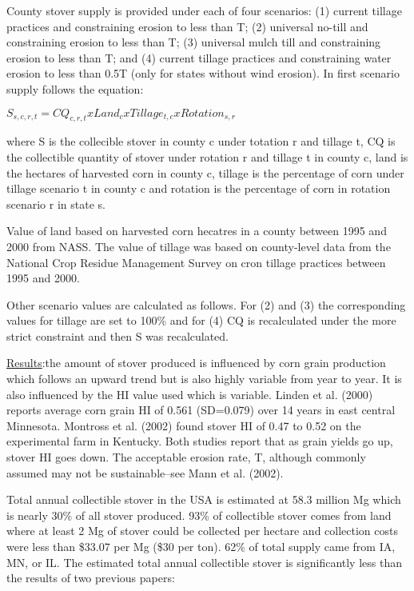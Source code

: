 \documentclass{article}\usepackage[]{graphicx}\usepackage[]{color}
\begin{document}
County stover supply is provided under each of four scenarios: (1) current tillage practices and constraining erosion to less than T; (2) universal no-till and constraining erosion to less than T; (3) universal mulch till and constraining erosion to less than T; and (4) current tillage practices and constraining water erosion to less than 0.5T (only for states without wind erosion).  In first scenario supply follows the equation: \\

\begin{centering}
$S_{s,c,r,t}=CQ_{c,r,t} x Land_c x Tillage_{t,c} x Rotation_{s,r}$
\end{centering}

where S is the collecible stover in county c under totation r and tillage t, CQ is the collectible quantity of stover under rotation r and tillage t in county c, land is the hectares of harvested corn in county c, tillage is the percentage of corn under tillage scenario t in county c and rotation is the percentage of corn in rotation scenario r in state s.

Value of land based on harvested corn hecatres in a county between 1995 and 2000 from NASS.  The value of tillage was based on county-level data from the National Crop Residue Management Survey on cron tillage practices between 1995 and 2000.  

Other scenario values are calculated as follows.  For (2) and (3) the corresponding values for tillage are set to 100\% and for (4) CQ is recalculated under the more strict constraint and then S was recalculated.

\underline{Results}:the amount of stover produced is influenced by corn grain production which follows an upward trend but is also highly variable from year to year.  It is also influenced by the HI value used which is variable.  Linden et al. (2000) reports average corn grain HI of 0.561 (SD=0.079) over 14 years in east central Minnesota.  Montross et al. (2002) found stover HI of 0.47 to 0.52 on the experimental farm in Kentucky.  Both studies report that as grain yields go up, stover HI goes down.  The acceptable erosion rate, T, although commonly assumed may not be sustainable--see Mann et al. (2002).  

Total annual collectible stover in the USA is estimated at 58.3 million Mg which is nearly 30\% of all stover produced.  93\% of collectible stover comes from land where at least 2 Mg of stover could be collected per hectare and collection costs were less than \$33.07 per Mg (\$30 per ton).  62\% of total supply came from IA, MN, or IL.  The estimated total annual collectible stover is significantly less than the results of two previous papers:
\end{document}
